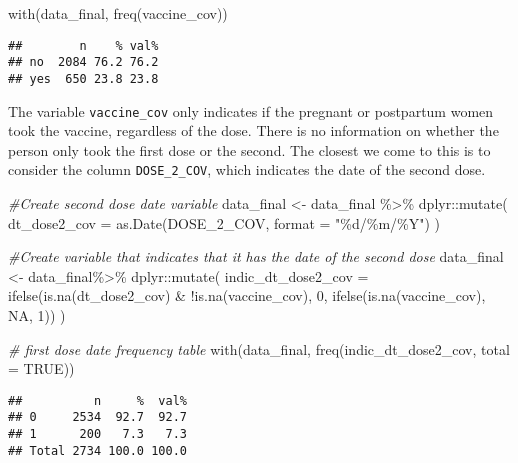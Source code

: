 \documentclass[
]{article}
\newenvironment{Shaded}{\begin{snugshade}}{\end{snugshade}}
\newcommand{\AttributeTok}[1]{\textcolor[rgb]{0.77,0.63,0.00}{#1}}
\newcommand{\CommentTok}[1]{\textcolor[rgb]{0.56,0.35,0.01}{\textit{#1}}}
\newcommand{\ConstantTok}[1]{\textcolor[rgb]{0.00,0.00,0.00}{#1}}
\newcommand{\DecValTok}[1]{\textcolor[rgb]{0.00,0.00,0.81}{#1}}
\newcommand{\FunctionTok}[1]{\textcolor[rgb]{0.00,0.00,0.00}{#1}}
\newcommand{\NormalTok}[1]{#1}
\newcommand{\OtherTok}[1]{\textcolor[rgb]{0.56,0.35,0.01}{#1}}
\newcommand{\SpecialCharTok}[1]{\textcolor[rgb]{0.00,0.00,0.00}{#1}}
\newcommand{\StringTok}[1]{\textcolor[rgb]{0.31,0.60,0.02}{#1}}
\begin{document}
\begin{Shaded}
\begin{Highlighting}[]
\FunctionTok{with}\NormalTok{(data\_final, }\FunctionTok{freq}\NormalTok{(vaccine\_cov))}
\end{Highlighting}
\end{Shaded}

\begin{verbatim}
##        n    % val%
## no  2084 76.2 76.2
## yes  650 23.8 23.8
\end{verbatim}

The variable \texttt{vaccine\_cov} only indicates if the pregnant or
postpartum women took the vaccine, regardless of the dose. There is no
information on whether the person only took the first dose or the
second. The closest we come to this is to consider the column
\texttt{DOSE\_2\_COV}, which indicates the date of the second dose.

\begin{Shaded}
\begin{Highlighting}[]
\CommentTok{\#Create second dose date variable}
\NormalTok{data\_final }\OtherTok{\textless{}{-}}\NormalTok{  data\_final }\SpecialCharTok{\%\textgreater{}\%}
\NormalTok{  dplyr}\SpecialCharTok{::}\FunctionTok{mutate}\NormalTok{(}
    \AttributeTok{dt\_dose2\_cov =} \FunctionTok{as.Date}\NormalTok{(DOSE\_2\_COV, }\AttributeTok{format =} \StringTok{"\%d/\%m/\%Y"}\NormalTok{)}
\NormalTok{  )}

\CommentTok{\#Create variable that indicates that it has the date of the second dose}
\NormalTok{data\_final }\OtherTok{\textless{}{-}}\NormalTok{  data\_final}\SpecialCharTok{\%\textgreater{}\%}
\NormalTok{  dplyr}\SpecialCharTok{::}\FunctionTok{mutate}\NormalTok{(}
    \AttributeTok{indic\_dt\_dose2\_cov =} \FunctionTok{ifelse}\NormalTok{(}\FunctionTok{is.na}\NormalTok{(dt\_dose2\_cov) }\SpecialCharTok{\&} \SpecialCharTok{!}\FunctionTok{is.na}\NormalTok{(vaccine\_cov), }\DecValTok{0}\NormalTok{, }\FunctionTok{ifelse}\NormalTok{(}\FunctionTok{is.na}\NormalTok{(vaccine\_cov), }\ConstantTok{NA}\NormalTok{, }\DecValTok{1}\NormalTok{))}
\NormalTok{  )}

\CommentTok{\# first dose date frequency table}
\FunctionTok{with}\NormalTok{(data\_final, }\FunctionTok{freq}\NormalTok{(indic\_dt\_dose2\_cov, }\AttributeTok{total =}  \ConstantTok{TRUE}\NormalTok{))}
\end{Highlighting}
\end{Shaded}

\begin{verbatim}
##          n     %  val%
## 0     2534  92.7  92.7
## 1      200   7.3   7.3
## Total 2734 100.0 100.0
\end{verbatim}
\end{document}
